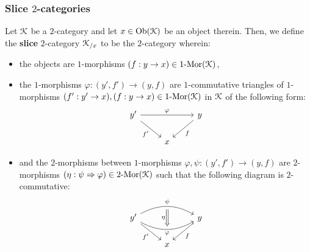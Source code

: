         \subsubsection{Slice \texorpdfstring{$2$}{}-categories}
            \begin{definition} \label{def: slice_2_categories}
                Let $\mathcal{K}$ be a $2$-category and let $x \in \mathrm{Ob}(\mathcal{K})$ be an object therein. Then, we define the \textbf{slice} $2$-category $\mathcal{K}_{/x}$ to be the $2$-category wherein:
                    \begin{itemize}
                        \item the objects are $1$-morphisms $(f: y \to x) \in 1\text{-}\mathrm{Mor}(\mathcal{K})$,
                        \item the $1$-morphisms $\varphi: (y', f') \to (y, f)$ are $1$-commutative triangles of $1$-morphisms $(f': y' \to x), (f: y \to x) \in 1\text{-}\mathrm{Mor}(\mathcal{K})$ in $\mathcal{K}$ of the following form:
                            $$
                                \begin{tikzcd}
                                	{y'} && y \\
                                	& x
                                	\arrow["\varphi", from=1-1, to=1-3]
                                	\arrow["{f'}"', from=1-1, to=2-2]
                                	\arrow["f", from=1-3, to=2-2]
                                \end{tikzcd}
                            $$
                        \item and the $2$-morphisms between $1$-morphisms $\varphi, \psi: (y', f') \to (y, f)$ are $2$-morphisms $(\eta: \psi \Rightarrow \varphi) \in 2\text{-}\mathrm{Mor}(\mathcal{K})$ such that the following diagram is $2$-commutative:
                            $$
                                \begin{tikzcd}
                                	{y'} && y \\
                                	& x
                                	\arrow["{f'}"', from=1-1, to=2-2]
                                	\arrow["f", from=1-3, to=2-2]
                                	\arrow[""{name=0, anchor=center, inner sep=0}, "\varphi"', bend right, from=1-1, to=1-3]
                                	\arrow[""{name=1, anchor=center, inner sep=0}, "\psi", bend left, from=1-1, to=1-3]
                                	\arrow["\eta"', shorten <=3pt, shorten >=3pt, Rightarrow, from=1, to=0]
                                \end{tikzcd}
                            $$
                    \end{itemize}
            \end{definition}
